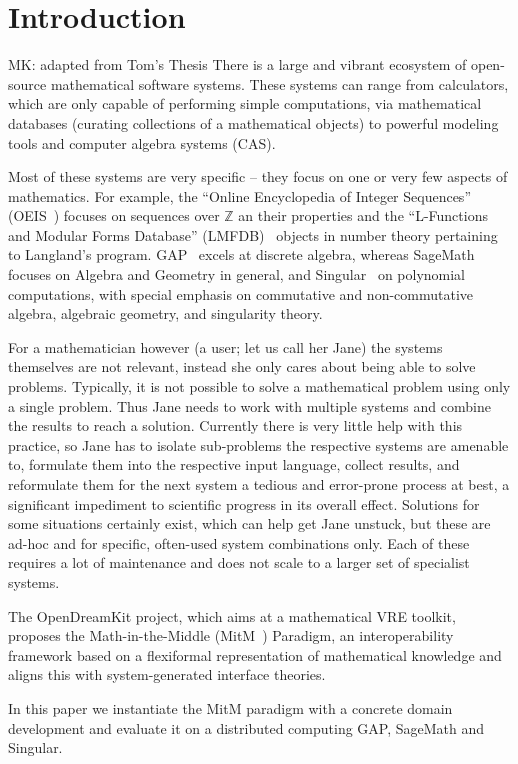 \section{Introduction}\label{sec:intro}

\begin{newpart}{MK: adapted from Tom's Thesis}
There is a large and vibrant ecosystem of open-source mathematical software systems.
These systems can range from calculators, which are only capable of performing simple
computations, via mathematical databases (curating collections of a mathematical objects)
to powerful modeling tools and computer algebra systems (CAS). 

Most of these systems are very specific -- they focus on one or very few aspects of
mathematics.  For example, the ``Online Encyclopedia of Integer Sequences''
(OEIS~\cite{Sloane:oeis12,oeis}) focuses on sequences over $\mathbb{Z}$ an their
properties and the ``L-Functions and Modular Forms Database''
(LMFDB)~\cite{Cremona:LMFDB16,lmfdb:on} objects in number theory pertaining to Langland's
program.  GAP~\cite{GAP:on} excels at discrete algebra, whereas
SageMath~\cite{SageMath:on} focuses on Algebra and Geometry in general, and
Singular~\cite{singular:on} on polynomial computations, with special emphasis on
commutative and non-commutative algebra, algebraic geometry, and singularity theory.

For a mathematician however (a user; let us call her Jane) the systems themselves are not relevant, instead she only cares about being able to solve problems. 
Typically, it is not possible to solve a mathematical problem using only a single problem. 
Thus Jane needs to work with multiple systems and combine the results to reach a solution. 
Currently there is very little help with this practice, so Jane has to isolate sub-problems the respective systems are amenable to, formulate them into the respective input language, collect results, and reformulate them for the next system a tedious and error-prone process at best, a significant impediment to scientific progress in its overall effect. 
Solutions for some situations certainly exist, which can help get Jane unstuck, but these are ad-hoc and for specific, often-used system combinations only. 
Each of these requires a lot of maintenance and does not scale to a larger set of specialist systems. 

The OpenDreamKit project, which aims at a mathematical VRE toolkit, proposes the Math-in-the-Middle (MitM~\cite{DehKohKon:iop16}) Paradigm, an interoperability framework based on a flexiformal
representation of mathematical knowledge and aligns this with system-generated interface
theories. 

In this paper we instantiate the MitM paradigm with a concrete domain development and
evaluate it on a distributed computing GAP, SageMath and Singular.

\end{newpart}

